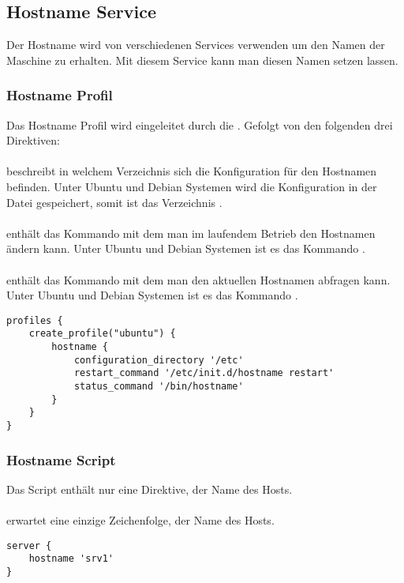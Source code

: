 \subsection{Hostname Service}

Der Hostname wird von verschiedenen Services verwenden um den Namen der Maschine
zu erhalten. Mit diesem Service kann man diesen Namen setzen lassen.

\subsubsection{Hostname Profil}

Das Hostname Profil wird eingeleitet durch die . Gefolgt von
den folgenden drei Direktiven:

\paragraph{}

beschreibt in welchem Verzeichnis
sich die Konfiguration für den Hostnamen befinden. Unter Ubuntu und Debian
Systemen wird die Konfiguration in der Datei  gespeichert,
somit ist das Verzeichnis .

\paragraph{}

enthält das Kommando mit dem man im
laufendem Betrieb den Hostnamen ändern kann.  Unter Ubuntu und Debian
Systemen ist es das Kommando 
.

\paragraph{}

enthält das Kommando mit dem man den
aktuellen Hostnamen abfragen kann. Unter Ubuntu und Debian Systemen ist es das
Kommando .

\begin{lstlisting}[style=Java, caption=Beispiel Hostname Profil Ubuntu Server]
profiles {
    create_profile("ubuntu") {
        hostname {
            configuration_directory '/etc'
            restart_command '/etc/init.d/hostname restart'
            status_command '/bin/hostname'
        }
    }
}
\end{lstlisting}

\subsubsection{Hostname Script}

Das Script enthält nur eine Direktive, der Name des Hosts.

\paragraph{}

erwartet eine einzige Zeichenfolge, der Name des Hosts.

\begin{lstlisting}[style=Java, caption=Beispiel Hostname Script]
server {
	hostname 'srv1'
}
\end{lstlisting}

